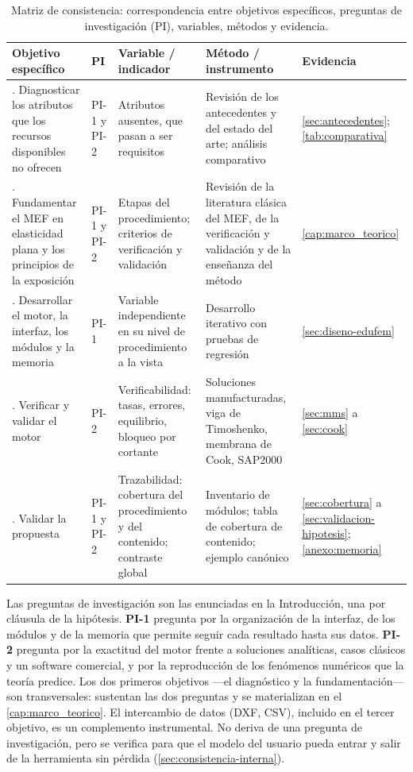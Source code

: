 \begin{table}[htbp]
\centering
\caption[Matriz de consistencia de la investigación.]{Matriz de consistencia: correspondencia entre objetivos específicos, preguntas de investigación (PI), variables, métodos y evidencia.}
\label{tab:consistencia}
{\footnotesize
\setlength{\tabcolsep}{3pt}
\renewcommand{\arraystretch}{1.15}
\begin{tabular}{@{}>{\raggedright\arraybackslash}p{3.0cm}>{\raggedright\arraybackslash}p{1.3cm}>{\raggedright\arraybackslash}p{3.0cm}>{\raggedright\arraybackslash}p{3.6cm}>{\raggedright\arraybackslash}p{2.7cm}@{}}
\toprule
\textbf{Objetivo específico} & \textbf{PI} & \textbf{Variable / indicador} & \textbf{Método / instrumento} & \textbf{Evidencia} \\
\midrule
1. Diagnosticar los atributos que los recursos disponibles no ofrecen & PI-1 y PI-2 & Atributos ausentes, que pasan a ser requisitos & Revisión de los antecedentes y del estado del arte; análisis comparativo & \autoref{sec:antecedentes}; \autoref{tab:comparativa} \\
2. Fundamentar el MEF en elasticidad plana y los principios de la exposición & PI-1 y PI-2 & Etapas del procedimiento; criterios de verificación y validación & Revisión de la literatura clásica del MEF, de la verificación y validación y de la enseñanza del método & \autoref{cap:marco_teorico} \\
3. Desarrollar el motor, la interfaz, los módulos y la memoria & PI-1 & Variable independiente en su nivel de procedimiento a la vista & Desarrollo iterativo con pruebas de regresión & \autoref{sec:diseno-edufem} \\
4. Verificar y validar el motor & PI-2 & Verificabilidad: tasas, errores, equilibrio, bloqueo por cortante & Soluciones manufacturadas, viga de Timoshenko, membrana de Cook, SAP2000 & \autoref{sec:mms} a \autoref{sec:cook} \\
5. Validar la propuesta & PI-1 y PI-2 & Trazabilidad: cobertura del procedimiento y del contenido; contraste global & Inventario de módulos; tabla de cobertura de contenido; ejemplo canónico & \autoref{sec:cobertura} a \autoref{sec:validacion-hipotesis}; \autoref{anexo:memoria} \\
\bottomrule
\end{tabular}}
\end{table}

Las preguntas de investigación son las enunciadas en la Introducción, una por cláusula de la hipótesis. \textbf{PI-1} pregunta por la organización de la interfaz, de los módulos y de la memoria que permite seguir cada resultado hasta sus datos. \textbf{PI-2} pregunta por la exactitud del motor frente a soluciones analíticas, casos clásicos y un software comercial, y por la reproducción de los fenómenos numéricos que la teoría predice. Los dos primeros objetivos —el diagnóstico y la fundamentación— son transversales: sustentan las dos preguntas y se materializan en el \autoref{cap:marco_teorico}. El intercambio de datos (DXF, CSV), incluido en el tercer objetivo, es un complemento instrumental. No deriva de una pregunta de investigación, pero se verifica para que el modelo del usuario pueda entrar y salir de la herramienta sin pérdida (\autoref{sec:consistencia-interna}).

